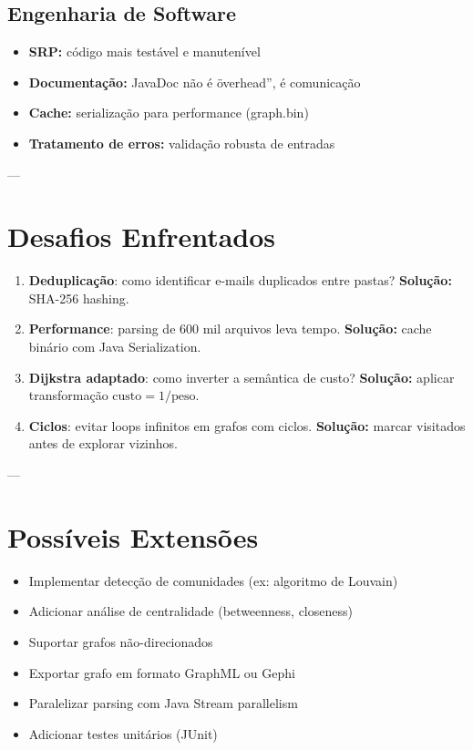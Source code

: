 \documentclass[12pt,openright,twoside,a4paper,english,brazilian,hidelinks]{abntex2}
\begin{document}
    \subsection{Engenharia de Software}

    \begin{itemize}
        \item \textbf{SRP:} código mais testável e manutenível
        \item \textbf{Documentação:} JavaDoc não é \"overhead'', é comunicação
        \item \textbf{Cache:} serialização para performance (graph.bin)
        \item \textbf{Tratamento de erros:} validação robusta de entradas
    \end{itemize}

    ---

    \section{Desafios Enfrentados}

    \begin{enumerate}
        \item \textbf{Deduplicação}: como identificar e-mails duplicados entre pastas?
        \textbf{Solução:} SHA-256 hashing.

        \item \textbf{Performance}: parsing de 600 mil arquivos leva tempo.
        \textbf{Solução:} cache binário com Java Serialization.

        \item \textbf{Dijkstra adaptado}: como inverter a semântica de custo?
        \textbf{Solução:} aplicar transformação $\text{custo} = 1/\text{peso}$.

        \item \textbf{Ciclos}: evitar loops infinitos em grafos com ciclos.
        \textbf{Solução:} marcar visitados antes de explorar vizinhos.
    \end{enumerate}

    ---

    \section{Possíveis Extensões}

    \begin{itemize}
        \item Implementar detecção de comunidades (ex: algoritmo de Louvain)
        \item Adicionar análise de centralidade (betweenness, closeness)
        \item Suportar grafos não-direcionados
        \item Exportar grafo em formato GraphML ou Gephi
        \item Paralelizar parsing com Java Stream parallelism
        \item Adicionar testes unitários (JUnit)
    \end{itemize}
\end{document}
